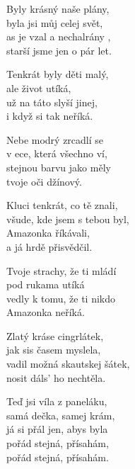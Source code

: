 
\ve{}
Byly krásný naše plány, \\
byla jsi můj celej svět, \\
as je vzal a nechalrány , \\
starší jsme jen o pár let. 


Tenkrát byly děti malý, \\
ale život utíká, \\
už na táto slyší jinej, \\
i když si tak neříká. 


\cho{}
Nebe modrý zrcadlí se \\
v ece, která všechno ví, \\
stejnou barvu jako měly \\
tvoje oči džínový. 
 
\ve{}
Kluci tenkrát, co tě znali, \\
všude, kde jsem s tebou byl, \\
Amazonka říkávali, \\
a já hrdě přisvědčil.


Tvoje strachy, že ti mládí \\
pod rukama utíká \\
vedly k tomu, že ti nikdo \\
Amazonka neříká.


\cho{}

\ve{}
Zlatý kráse cingrlátek, \\
jak sis časem myslela, \\
vadil možná skautskej šátek, \\
nosit dáls' ho nechtěla.

\cho{}
Teď jsi víla z paneláku, \\
samá dečka, samej krám, \\
já si přál jen, abys byla \\
pořád stejná, přísahám, \\
pořád stejná, přísahám. 

\esong{}